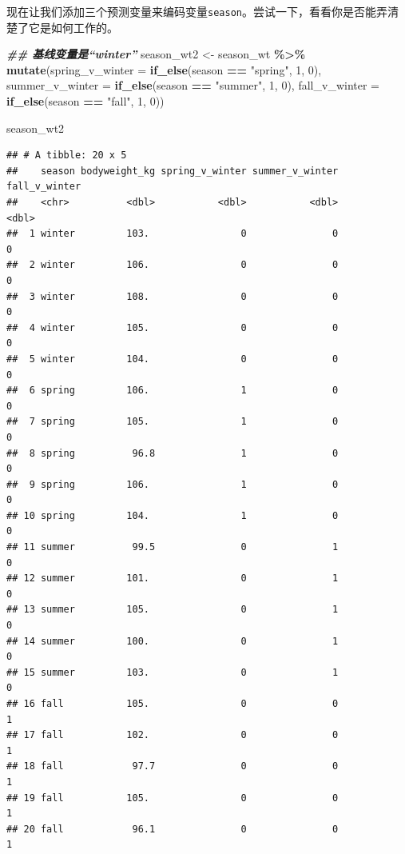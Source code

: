 \documentclass[
]{book}
\newenvironment{Shaded}{\begin{snugshade}}{\end{snugshade}}
\newcommand{\AttributeTok}[1]{\textcolor[rgb]{0.13,0.29,0.53}{#1}}
\newcommand{\DecValTok}[1]{\textcolor[rgb]{0.00,0.00,0.81}{#1}}
\newcommand{\DocumentationTok}[1]{\textcolor[rgb]{0.56,0.35,0.01}{\textbf{\textit{#1}}}}
\newcommand{\FunctionTok}[1]{\textcolor[rgb]{0.13,0.29,0.53}{\textbf{#1}}}
\newcommand{\NormalTok}[1]{#1}
\newcommand{\OtherTok}[1]{\textcolor[rgb]{0.56,0.35,0.01}{#1}}
\newcommand{\SpecialCharTok}[1]{\textcolor[rgb]{0.81,0.36,0.00}{\textbf{#1}}}
\newcommand{\StringTok}[1]{\textcolor[rgb]{0.31,0.60,0.02}{#1}}
\begin{document}
现在让我们添加三个预测变量来编码变量\texttt{season}。尝试一下，看看你是否能弄清楚了它是如何工作的。

\begin{Shaded}
\begin{Highlighting}[]
\DocumentationTok{\#\# 基线变量是“winter”}
\NormalTok{season\_wt2 }\OtherTok{\textless{}{-}}\NormalTok{ season\_wt }\SpecialCharTok{\%\textgreater{}\%}
  \FunctionTok{mutate}\NormalTok{(}\AttributeTok{spring\_v\_winter =} \FunctionTok{if\_else}\NormalTok{(season }\SpecialCharTok{==} \StringTok{"spring"}\NormalTok{, }\DecValTok{1}\NormalTok{, }\DecValTok{0}\NormalTok{),}
         \AttributeTok{summer\_v\_winter =} \FunctionTok{if\_else}\NormalTok{(season }\SpecialCharTok{==} \StringTok{"summer"}\NormalTok{, }\DecValTok{1}\NormalTok{, }\DecValTok{0}\NormalTok{),}
         \AttributeTok{fall\_v\_winter =} \FunctionTok{if\_else}\NormalTok{(season }\SpecialCharTok{==} \StringTok{"fall"}\NormalTok{, }\DecValTok{1}\NormalTok{, }\DecValTok{0}\NormalTok{))}

\NormalTok{season\_wt2}
\end{Highlighting}
\end{Shaded}

\begin{verbatim}
## # A tibble: 20 x 5
##    season bodyweight_kg spring_v_winter summer_v_winter fall_v_winter
##    <chr>          <dbl>           <dbl>           <dbl>         <dbl>
##  1 winter         103.                0               0             0
##  2 winter         106.                0               0             0
##  3 winter         108.                0               0             0
##  4 winter         105.                0               0             0
##  5 winter         104.                0               0             0
##  6 spring         106.                1               0             0
##  7 spring         105.                1               0             0
##  8 spring          96.8               1               0             0
##  9 spring         106.                1               0             0
## 10 spring         104.                1               0             0
## 11 summer          99.5               0               1             0
## 12 summer         101.                0               1             0
## 13 summer         105.                0               1             0
## 14 summer         100.                0               1             0
## 15 summer         103.                0               1             0
## 16 fall           105.                0               0             1
## 17 fall           102.                0               0             1
## 18 fall            97.7               0               0             1
## 19 fall           105.                0               0             1
## 20 fall            96.1               0               0             1
\end{verbatim}
\end{document}
